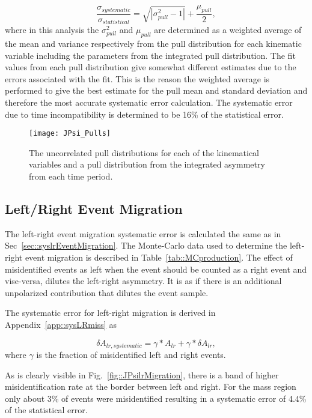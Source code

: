 \begin{equation}
  \label{equ::sysErrorPullJPsi}
  \frac{\sigma_{systematic}}{\sigma_{statistical}} =
  \sqrt{|\sigma^2_{pull} - 1|} + \frac{\mu_{pull}}{2},
\end{equation}
\noindent
where in this analysis the $\sigma_{pull}^2$ and $\mu_{pull}$ are determined as
a weighted average of the mean and variance respectively from the pull
distribution for each kinematic variable including the parameters from the
integrated pull distribution.  The fit values from each pull distribution give
somewhat different estimates due to the errors associated with the fit.  This is
the reason the weighted average is performed to give the best estimate for the
pull mean and standard deviation and therefore the most accurate systematic
error calculation.  The systematic error due to time incompatibility is
determined to be 16\% of the statistical error.

\begin{figure}[h!t]
  \centering \texttt{[image: JPsi\_Pulls]}
  \caption{The uncorrelated pull distributions for each of the kinematical
    variables and a pull distribution from the integrated asymmetry from each
    time period.}
  \label{fig::JPsi_Pulls}
\end{figure}


\subsection{Left/Right Event Migration}
The left-right event migration systematic error is calculated the same as in
Sec~\ref{sec::syslrEventMigration}.  The Monte-Carlo data used to determine the
left-right event migration is described in Table~\ref{tab::MCproduction}.  The
effect of misidentified events as left when the event should be counted as a
right event and vise-versa, dilutes the left-right asymmetry.  It is as if
there is an additional unpolarized contribution that dilutes the event sample.

The systematic error for left-right migration is derived in
Appendix~\ref{app::sysLRmiss} as

\begin{equation}
  \delta A_{lr,systematic} = \gamma *A_{lr} + \gamma *\delta A_{lr},
\end{equation}
\noindent
where $\gamma$ is the fraction of misidentified left and right events.  

As is clearly visible in Fig.~\ref{fig::JPsilrMigration}, there is a band of
higher misidentification rate at the border between left and right.  For the
{\jp} mass region only about 3\% of events were misidentified resulting in a
systematic error of 4.4\% of the statistical error.

